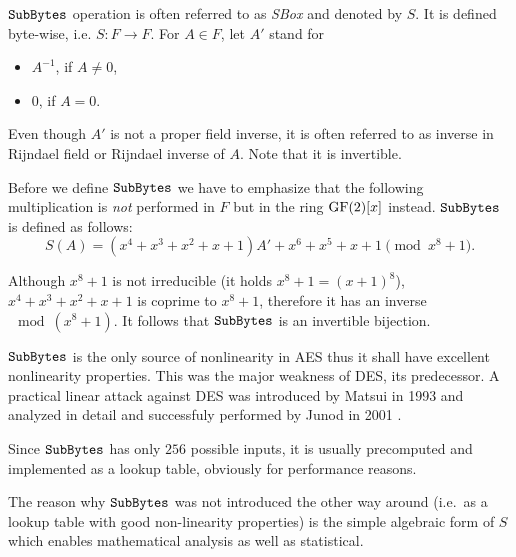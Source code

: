 	$\texttt{SubBytes}$ operation is often referred to as {\em SBox} and denoted by $S$. It is defined byte-wise, i.e. $S: F \rightarrow F$. For $A\in F$, let $A'$ stand for
	\begin{itemize}
		\item $A^{-1}$, if $A \neq 0$,
		\item $0$, if $A = 0$.
	\end{itemize}
	
	\begin{note}
	\label{note:rijinv}
		Even though $A'$ is not a proper field inverse, it is often referred to as inverse in Rijndael field or Rijndael inverse of $A$. Note that it is invertible.
	\end{note}
	
	Before we define $\texttt{SubBytes}$ we have to emphasize that the following multiplication is {\em not} performed in $F$ but in the ring $\mathrm{GF}(2)[x]$ instead. $\texttt{SubBytes}$ is defined as follows:
	\newcommand{\defsbox}{S(A) = (x^4 + x^3 + x^2 + x + 1)A' + x^6 + x^5 + x + 1 \pmod{x^8+1}}
	\begin{equation}
	\label{eq:sbox}
		\defsbox .
	\end{equation}
	
	\begin{note}
	\label{note:sboxinv}
		Although $x^8+1$ is not irreducible (it holds $x^8+1 = (x+1)^8$), $x^4 + x^3 + x^2 + x + 1$ is coprime to $x^8+1$, therefore it has an inverse$\mod(x^8+1)$. It follows that $\texttt{SubBytes}$ is an invertible bijection.
	\end{note}
	
	$\texttt{SubBytes}$ is the only source of nonlinearity in AES thus it shall have excellent nonlinearity properties. This was the major weakness of DES, its predecessor. A practical linear attack against DES was introduced by Matsui in 1993 \cite{matsui1994linear} and analyzed in detail and successfuly performed by Junod in 2001 \cite{junod2001complexity}.
	
	\begin{note}
	\label{note:sboxtable}
		Since $\texttt{SubBytes}$ has only $256$ possible inputs, it is usually precomputed and implemented as a lookup table, obviously for performance reasons.
	\end{note}
	
	The reason why $\texttt{SubBytes}$ was not introduced the other way around (i.e.\ as a lookup table with good non-linearity properties) is the simple algebraic form of $S$ which enables mathematical analysis as well as statistical.   %

